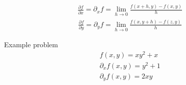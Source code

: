 \documentclass[12pt, letterpaper]{article}
\begin{document}
\begin{gather}
  \frac{\partial f}{\partial x} = \partial_x{f} = \lim_{h \to 0} \frac{f(x+h, y) − f(x,y)}{h}
  \label{eq:partX}
\end{gather}
\begin{gather}
  \frac{\partial f}{\partial y} = \partial_y{f} = \lim_{h \to 0} \frac{f(x, y + h) − f(z,y)}{h}
  \label{eq:partY}
\end{gather}

\begin{center}
 Example problem
 \begin{gather*}
  f(x, y) = xy^2 + x \\
  \partial_x f(x,y) = y^2 + 1 \\
  \partial_y f(x,y) = 2xy
 \end{gather*}
\end{center}
\end{document}
